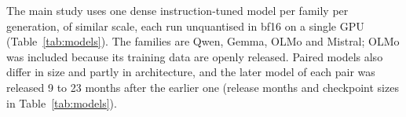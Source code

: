 The main study uses one dense instruction-tuned model per family per
generation, of similar scale, each run unquantised in bf16 on a single GPU
(Table~\ref{tab:models}). The families are Qwen, Gemma, OLMo and Mistral; OLMo
was included because its training data are openly released. Paired models also
differ in size and partly in architecture, and the later model of each pair
was released 9 to 23 months after the earlier one (release months and
checkpoint sizes in Table~\ref{tab:models}).

